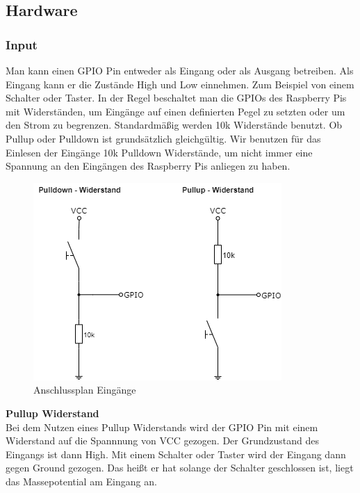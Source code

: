 \subsection{Hardware}

\subsubsection{Input}

Man kann einen GPIO Pin entweder als Eingang oder als Ausgang betreiben. Als Eingang kann er die Zustände High und Low einnehmen. Zum Beispiel von einem Schalter oder Taster. In der Regel beschaltet man die GPIOs des Raspberry Pis mit Widerständen, um Eingänge auf einen definierten Pegel zu setzten oder um den Strom zu begrenzen. Standardmäßig werden 10k Widerstände benutzt. Ob Pullup oder Pulldown ist grundsätzlich gleichgültig. Wir benutzen für das Einlesen der Eingänge 10k Pulldown Widerstände, um nicht immer eine Spannung an den Eingängen des Raspberry Pis anliegen zu haben.

\begin{figure}[H]
	\begin{center}
		\includegraphics[scale=0.8]{figures/hcis/input.png}
			\caption{Anschlussplan Eingänge}
			\label{fig:input}
	\end{center}
\end{figure}

\textbf{Pullup Widerstand}\\

Bei dem Nutzen eines Pullup Widerstands wird der GPIO Pin mit einem Widerstand auf die Spannnung von VCC gezogen. Der Grundzustand des Eingangs ist dann High. Mit einem Schalter oder Taster wird der Eingang dann gegen Ground gezogen. Das heißt er hat solange der Schalter geschlossen ist, liegt das Massepotential am Eingang an.\\\medskip

